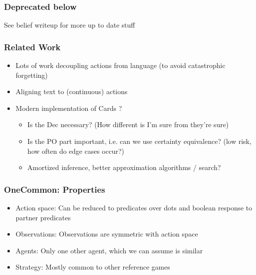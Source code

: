 \documentclass{beamer}
\begin{document}
\begin{frame}
\frametitle{Deprecated below}
See belief writeup for more up to date stuff
\end{frame}

\begin{frame}
\frametitle{Related Work}
\begin{itemize}
\item Lots of work decoupling actions from language (to avoid catastrophic forgetting)
\item Aligning text to (continuous) actions \citep{latentactions}
\item Modern implementation of Cards \citep{cards}?
    \begin{itemize}
    \item Is the Dec necessary? (How different is I'm sure from they're sure) 
    \item Is the PO part important, i.e. can we use certainty equivalence?
        (low risk, how often do edge cases occur?)
    \item Amortized inference, better approximation algorithms / search?
    \end{itemize}
\end{itemize}
\end{frame}

\begin{frame}
\frametitle{OneCommon: Properties}
\begin{itemize}
\item Action space: Can be reduced to predicates over dots and boolean response
    to partner predicates
\item Observations: Observations are symmetric with action space
\item Agents: Only one other agent, which we can assume is similar
\item Strategy: Mostly common to other reference games
\end{itemize}
\end{frame}
\end{document}
